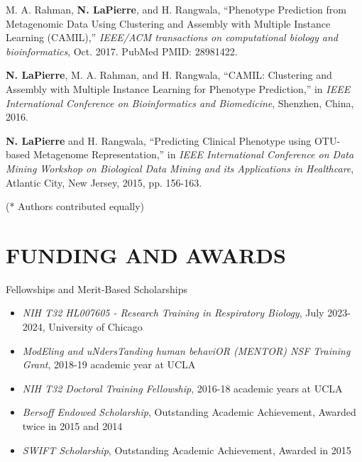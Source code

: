 \documentclass[margin, 10pt]{res} %
\begin{document}
\begin{resume}
M. A. Rahman, \textbf{N. LaPierre}, and H. Rangwala, ``Phenotype Prediction from Metagenomic Data Using Clustering and Assembly with Multiple Instance Learning (CAMIL),'' \emph{IEEE/ACM transactions on computational biology and bioinformatics}, Oct. 2017. PubMed PMID: 28981422.

\textbf{N. LaPierre}, M. A. Rahman, and H. Rangwala, ``CAMIL: Clustering and Assembly with Multiple Instance Learning for Phenotype Prediction,'' in {\sl IEEE International Conference on Bioinformatics and Biomedicine}, Shenzhen, China, 2016.

\textbf{N. LaPierre} and H. Rangwala, ``Predicting Clinical Phenotype using OTU-based Metagenome Representation,'' in {\sl IEEE International Conference on Data Mining Workshop on Biological Data Mining and its Applications in Healthcare}, Atlantic City, New Jersey, 2015, pp. 156-163.

(*  Authors contributed equally)



\section{FUNDING AND AWARDS}

Fellowships and Merit-Based Scholarships
\begin{itemize} \itemsep -2pt %
\item {\sl NIH T32 HL007605 - Research Training in Respiratory Biology}, July 2023-2024, University of Chicago
\item {\sl ModEling and uNdersTanding human behaviOR (MENTOR) NSF Training Grant}, 2018-19 academic year at UCLA
\item {\sl NIH T32 Doctoral Training Fellowship}, 2016-18 academic years at UCLA
\item {\sl Bersoff Endowed Scholarship}, Outstanding Academic Achievement, Awarded twice in 2015 and 2014
\item {\sl SWIFT Scholarship}, Outstanding Academic Achievement, Awarded in 2015
\end{itemize}


\end{resume}
\end{document}
